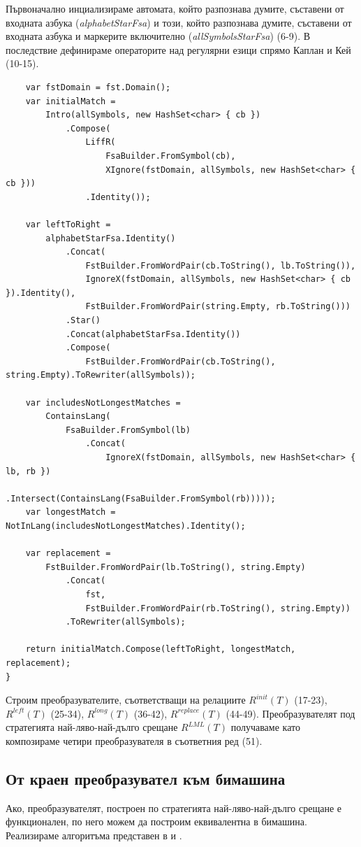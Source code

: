 \documentclass[12pt, oneside]{article}
\theoremstyle{definition}
\begin{document}
Първоначално инциализираме автомата, който разпознава думите, съставени от входната азбука (\emph{alphabetStarFsa}) и този, който разпознава думите, съставени от входната азбука и маркерите включително (\emph{allSymbolsStarFsa}) (6-9). В последствие дефинираме операторите над регулярни езици спрямо Каплан и Кей \cite{Kaplan&Kay:94} (10-15).

\begin{verbatim}
	var fstDomain = fst.Domain();
	var initialMatch =
		Intro(allSymbols, new HashSet<char> { cb })
			.Compose(
				LiffR(
					FsaBuilder.FromSymbol(cb),
					XIgnore(fstDomain, allSymbols, new HashSet<char> { cb }))
				.Identity());

	var leftToRight =
		alphabetStarFsa.Identity()
			.Concat(
				FstBuilder.FromWordPair(cb.ToString(), lb.ToString()),
				IgnoreX(fstDomain, allSymbols, new HashSet<char> { cb }).Identity(),
				FstBuilder.FromWordPair(string.Empty, rb.ToString()))
			.Star()
			.Concat(alphabetStarFsa.Identity())
			.Compose(
				FstBuilder.FromWordPair(cb.ToString(), string.Empty).ToRewriter(allSymbols));

	var includesNotLongestMatches =
		ContainsLang(
			FsaBuilder.FromSymbol(lb)
				.Concat(
					IgnoreX(fstDomain, allSymbols, new HashSet<char> { lb, rb })
						.Intersect(ContainsLang(FsaBuilder.FromSymbol(rb)))));
	var longestMatch = NotInLang(includesNotLongestMatches).Identity();

	var replacement =
		FstBuilder.FromWordPair(lb.ToString(), string.Empty)
			.Concat(
				fst,
				FstBuilder.FromWordPair(rb.ToString(), string.Empty))
			.ToRewriter(allSymbols);

	return initialMatch.Compose(leftToRight, longestMatch, replacement);
}
\end{verbatim}

Строим преобразувателите, съответстващи на релациите \( R^{init}(T) \) (17-23), \(R^{left}(T)\) (25-34), \(R^{long}(T)\) (36-42), \(R^{replace}(T) \) (44-49). Преобразувателят под стратегията най-ляво-най-дълго срещане \(R^{LML}(T)\) получаваме като композираме четири преобразувателя в съответния ред (51).

\subsection{От краен преобразувател към бимашина}

Ако, преобразувателят, построен по стратегията най-ляво-най-дълго срещане е функционален, по него можем да построим еквивалентна в бимашина. Реализираме алгоритъма представен в \cite{GerdjikovEtAl:2017} и \cite{Mihov:2018-2}.
\end{document}
